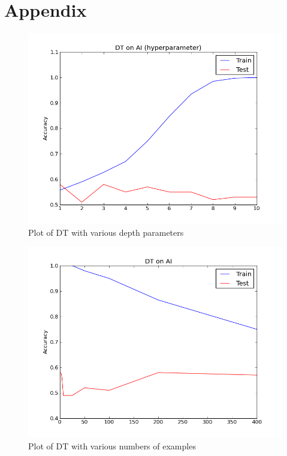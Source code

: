 \section*{Appendix}

\begin{figure}[here]
	\caption{Plot of DT with various depth parameters}
	\label{fig:dt_depth}
	\includegraphics[width=6.5in]{images/dt_depth.png}
\end{figure}

\begin{figure}[here]
	\caption{Plot of DT with various numbers of examples}
	\label{fig:dt_examples}
	\includegraphics[width=6.5in]{images/dt_examples.png}
\end{figure}

